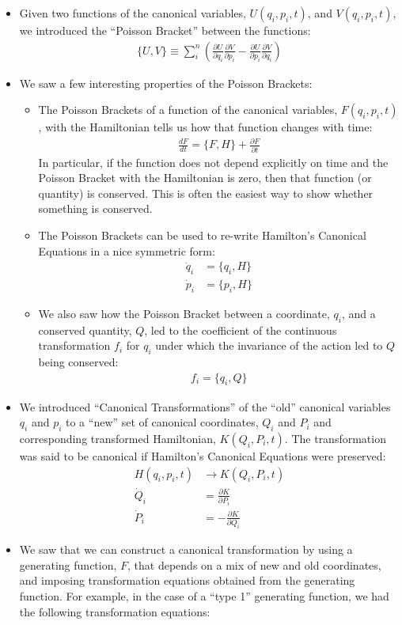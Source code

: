 \documentclass[10pt]{report}
\newcommand{\die}[2]{\frac{\partial #1}{\partial #2}}
\begin{document}
\begin{itemize}
\item Given two functions of the canonical variables, $U(q_i,p_i,t)$, and $V(q_i, p_i, t)$, we introduced the ``Poisson Bracket'' between the functions:
\begin{align*}
\{U,V\}\equiv\sum_i^n\left(\die{U}{q_i}\die{V}{p_i}-\die{U}{p_i}\die{V}{q_i}\right)
\end{align*}
\item We saw a few interesting properties of the Poisson Brackets:
\begin{itemize}
\item The Poisson Brackets of a function of the canonical variables, $F(q_i,p_i,t)$, with the Hamiltonian tells us how that function changes with time:
\begin{align*}
\frac{dF}{dt}=\{F,H\}+\die{F}{t}
\end{align*}
In particular, if the function does not depend explicitly on time and the Poisson Bracket with the Hamiltonian is zero, then that function (or quantity) is conserved. This is often the easiest way to show whether something is conserved. 
\item The Poisson Brackets can be used to re-write Hamilton's Canonical Equations in a nice symmetric form:
\begin{align*}
\dot q_i&=\{q_i,H\}\\
\dot p_i&=\{p_i,H\}
\end{align*} 
\item We also saw how the Poisson Bracket between a coordinate, $q_i$, and a conserved quantity, $Q$,  led to the coefficient of the continuous transformation $f_i$ for $q_i$ under which the invariance of the action led to $Q$ being conserved:
\begin{align*}
f_i = \{q_i,Q\}
\end{align*}
\end{itemize}
\item We introduced ``Canonical Transformations'' of the ``old'' canonical variables $q_i$ and $p_i$ to a ``new'' set of canonical coordinates, $Q_i$ and $P_i$ and corresponding transformed Hamiltonian, $K(Q_i,P_i,t)$. The transformation was said to be canonical if Hamilton's Canonical Equations were preserved:
\begin{align*}
H(q_i,p_i,t)&\to K(Q_i,P_i,t)\nonumber\\
\dot Q_i&=\die{K}{P_i}\nonumber\\
\dot P_i&=-\die{K}{Q_i}
\end{align*}
\item We saw that we can construct a canonical transformation by using a generating function, $F$, that depends on a mix of new and old coordinates, and imposing transformation equations obtained from the generating function. For example, in the case of a ``type 1'' generating function, we had the following transformation equations:

\end{itemize}
\end{document}
